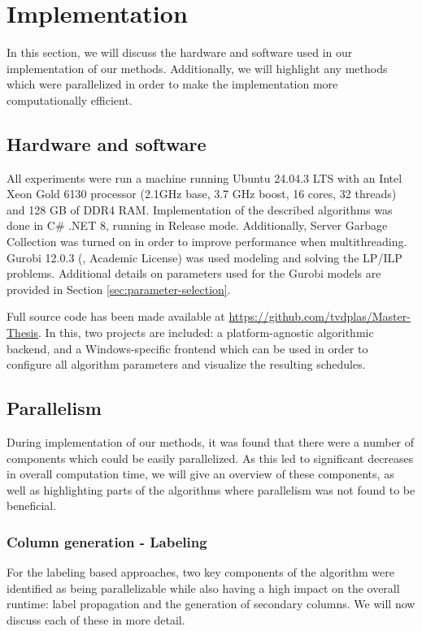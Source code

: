 \documentclass[]{article}
\begin{document}
\section{Implementation}
In this section, we will discuss the hardware and software used in our implementation of our methods. Additionally, we will highlight any methods which were parallelized in order to make the implementation more computationally efficient. 

\subsection{Hardware and software}
All experiments were run a machine running Ubuntu 24.04.3 LTS with an Intel Xeon Gold 6130 processor (2.1GHz base, 3.7 GHz boost, 16 cores, 32 threads) and 128 GB of DDR4 RAM.  Implementation of the described algorithms was done in C\# .NET 8, running in Release mode. Additionally, Server Garbage Collection was turned on in order to improve performance when multithreading. Gurobi 12.0.3 (\citet{Gurobi2025}, Academic License) was used modeling and solving the LP/ILP problems. Additional details on parameters used for the Gurobi models are provided in Section \ref{sec:parameter-selection}.

Full source code has been made available at \url{https://github.com/tvdplas/Master-Thesis}. In this, two projects are included: a platform-agnostic algorithmic backend, and a Windows-specific frontend which can be used in order to configure all algorithm parameters and visualize the resulting schedules.

\subsection{Parallelism}
During implementation of our methods, it was found that there were a number of components which could be easily parallelized. As this led to significant decreases in overall computation time, we will give an overview of these components, as well as highlighting parts of the algorithms where parallelism was not found to be beneficial.

\subsubsection{Column generation - Labeling}
For the labeling based approaches, two key components of the algorithm were identified as being parallelizable while also having a high impact on the overall runtime: label propagation and the generation of secondary columns. We will now discuss each of these in more detail. 
\end{document}
